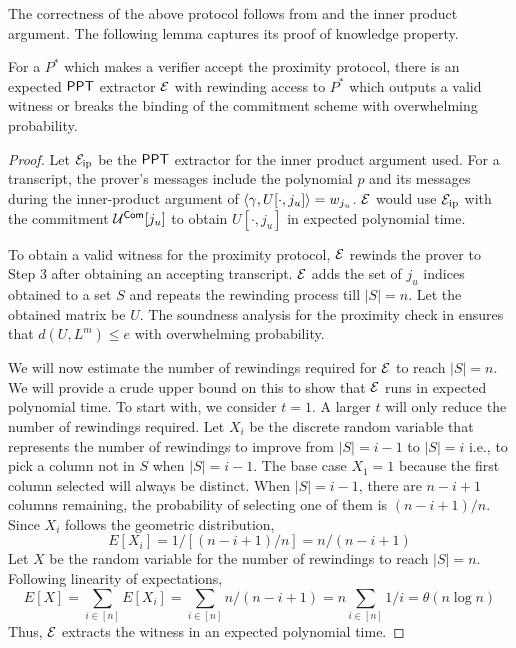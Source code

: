 The correctness of the above protocol follows from \cite{ligero} and the inner product argument. The following lemma captures its proof of knowledge property.
\begin{lemma}\label{lem:proximity}
	For a $P^*$ which makes a verifier accept the proximity protocol, there is an expected $\mathsf{PPT}$ extractor $\mathcal{E}$ with rewinding access to $P^*$ which outputs a valid witness or breaks the binding of the commitment scheme with overwhelming probability.
\end{lemma}
\begin{proof}
	Let $\mathcal{E}_{\mathrm{ip}}$ be the $\mathsf{PPT}$ extractor for the inner product argument used. For a transcript, the prover's messages include the polynomial $p$ and its messages during the inner-product argument of $\langle \gamma,U[\cdot, j_u]\rangle = w_{j_u}$.
	$\mathcal{E}$ would use $\mathcal{E}_{\mathrm{ip}}$ with the commitment $\mathcal{U}^{\mathsf{Com}}[j_u]$ to obtain $U[\cdot,j_u]$ in expected polynomial time. 
	
	To obtain a valid witness for the proximity protocol, $\mathcal{E}$ rewinds the prover to Step 3 after obtaining an accepting transcript. $\mathcal{E}$ adds the set of $j_u$ indices obtained to a set $S$ and repeats the rewinding process till $|S| = n$. Let the obtained matrix be $U$.
	The soundness analysis for the proximity check in \cite{ligero} ensures that  $d(U, L^m) \leq e$ with overwhelming probability. 
	
	We will now estimate the number of rewindings required for $\mathcal{E}$ to reach $|S| = n$. We will provide a crude upper bound on this to show that $\mathcal{E}$ runs in expected polynomial time. To start with, we consider $t=1$. A larger $t$ will only reduce the number of rewindings required. Let $X_i$ be the discrete random variable that represents the number of rewindings to improve from $|S| = i-1$ to $|S| = i$ i.e., to pick a column not in $S$ when $|S| = i-1$. The base case $X_1=1$ because the first column selected will always be distinct. When $|S| = i-1$, there are $n-i+1$ columns remaining, the probability of selecting one of them is $(n-i+1)/n$. Since $X_i$ follows the geometric distribution, 
	\[
	E[X_i] = 1/ [(n-i+1)/n] = n/ (n-i+1)
	\]
	Let $X$ be the random variable for the number of rewindings to reach $|S| = n$.
	Following linearity of expectations, 
	\[
	E[X] = \sum_{i \in [n]} E[X_i] = \sum_{i \in [n]} n/ (n-i+1) = n \sum_{i \in [n]} 1/i = \theta (n \log n) 
	\]
	Thus, $\mathcal{E}$ extracts the witness in an expected polynomial time.
\end{proof}
